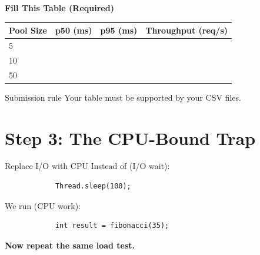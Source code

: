 \documentclass[11pt]{beamer}
\begin{document}
	\begin{frame}{\textbf{Fill This Table (Required)}}
		\small
		\begin{tabular}{lccc}
			\textbf{Pool Size} & \textbf{p50 (ms)} & \textbf{p95 (ms)} & \textbf{Throughput (req/s)} \\
			\hline
			5   & \hspace{12mm} & \hspace{12mm} & \hspace{16mm} \\
			10  & \hspace{12mm} & \hspace{12mm} & \hspace{16mm} \\
			50  & \hspace{12mm} & \hspace{12mm} & \hspace{16mm} \\
		\end{tabular}
		
		
		\begin{alertblock}{Submission rule}
			Your table must be supported by your CSV files.
		\end{alertblock}
	\end{frame}
	
	\section{Step 3: The CPU-Bound Trap}
	
	\begin{frame}[fragile]{Replace I/O with CPU}
		Instead of (I/O wait):
		\begin{lstlisting}
			Thread.sleep(100);
		\end{lstlisting}
		
		We run (CPU work):
		\begin{lstlisting}
			int result = fibonacci(35);
		\end{lstlisting}

		
		\textbf{Now repeat the same load test.}
	\end{frame}
	
\end{document}
